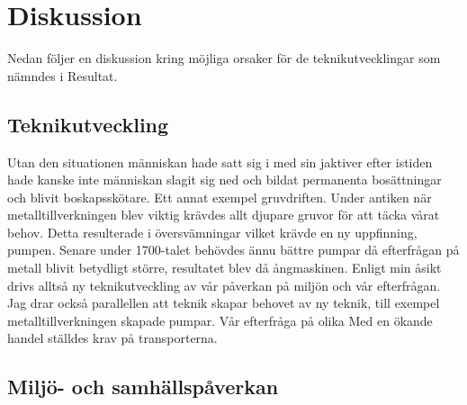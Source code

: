 \section{Diskussion}
Nedan följer en diskussion kring möjliga orsaker för de teknikutvecklingar som nämndes i Resultat. 

\subsection{Teknikutveckling}
Utan den situationen människan hade satt sig i med sin jaktiver efter istiden hade kanske inte människan slagit sig ned och bildat permanenta bosättningar och blivit boskapsskötare. Ett annat exempel gruvdriften. Under antiken när metalltillverkningen blev viktig krävdes allt djupare gruvor för att täcka vårat behov. Detta resulterade i översvämningar vilket krävde en ny uppfinning, pumpen. Senare under 1700-talet behövdes ännu bättre pumpar då efterfrågan på metall blivit betydligt större, resultatet blev då ångmaskinen. Enligt min åsikt drivs alltså ny teknikutveckling av vår påverkan på miljön och vår efterfrågan. Jag drar också parallellen att teknik skapar behovet av ny teknik, till exempel metalltillverkningen skapade pumpar. 
\newline
\newline
Vår efterfråga på olika 
\newline
\newline
Med en ökande handel ställdes krav på transporterna. 
       

\subsection{Miljö- och samhällspåverkan}
